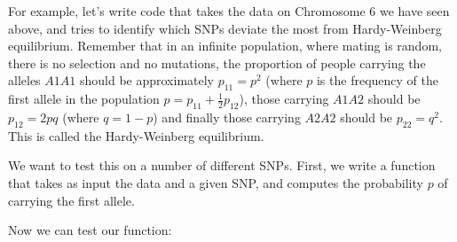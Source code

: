 \documentclass[
  letterpaper,
  DIV=11,
  numbers=noendperiod]{scrreprt}
\newenvironment{Shaded}{\begin{snugshade}}{\end{snugshade}}
\newcommand{\NormalTok}[1]{\textcolor[rgb]{0.00,0.23,0.31}{#1}}
\begin{document}
For example, let's write code that takes the data on Chromosome 6 we
have seen above, and tries to identify which SNPs deviate the most from
Hardy-Weinberg equilibrium. Remember that in an infinite population,
where mating is random, there is no selection and no mutations, the
proportion of people carrying the alleles \(A1A1\) should be
approximately \(p_{11} = p^2\) (where \(p\) is the frequency of the
first allele in the population \(p = p_{11} + \frac{1}{2} p_{12}\)),
those carrying \(A1A2\) should be \(p_{12} = 2 p q\) (where \(q = 1-p\))
and finally those carrying \(A2A2\) should be \(p_{22} = q^2\). This is
called the Hardy-Weinberg equilibrium.

We want to test this on a number of different SNPs. First, we write a
function that takes as input the data and a given SNP, and computes the
probability \(p\) of carrying the first allele.

\begin{Shaded}
\end{Shaded}

Now we can test our function:
\end{document}
